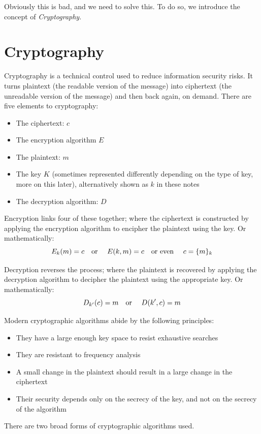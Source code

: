 Obviously this is bad, and we need to solve this. To do so, we introduce the concept of \textit{Cryptography}.

\section{Cryptography}
Cryptography is a technical control used to reduce information security risks. It turns plaintext (the readable version of the message) into ciphertext (the unreadable version of the message) and then back again, on demand. There are five elements to cryptography:
\begin{itemize}
    \item The ciphertext: $c$
    \item The encryption algorithm $E$
    \item The plaintext: $m$
    \item The key $K$ (sometimes represented differently depending on the type of key, more on this later), alternatively shown as $k$ in these notes
    \item The decryption algorithm: $D$
\end{itemize}

Encryption links four of these together; where the ciphertext is constructed by applying the encryption algorithm to encipher the plaintext using the key. Or mathematically:
\[E_k(m) = c \textrm{\quad or \quad } E(k,m) = c \textrm{\quad or even \quad } c=\{m\}_k\]

Decryption reverses the process; where the plaintext is recovered by applying the decryption algorithm to decipher the plaintext using the appropriate key. Or mathematically:
\[D_{k'}(c) = m \textrm{\quad or \quad } D(k',c)=m\]

Modern cryptographic algorithms abide by the following principles:
\begin{itemize}
    \item They have a large enough key space to resist exhaustive searches
    \item They are resistant to frequency analysis
    \item A small change in the plaintext should result in a large change in the ciphertext
    \item Their security depends only on the secrecy of the key, and not on the secrecy of the algorithm
\end{itemize}

There are two broad forms of cryptographic algorithms used.

